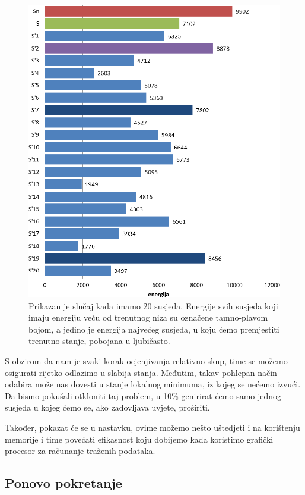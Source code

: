 \documentclass[times, utf8, zavrsni]{fer}
\begin{document}
\begin{figure}
\centering
\includegraphics[scale=0.5]{res/energije_susjeda.png}
\caption[Korištenje više susjeda u algoritmu simuliranog kaljenja]{
Prikazan je slučaj kada imamo 20 susjeda. Energije svih susjeda koji
imaju energiju veću od trenutnog niza su označene tamno-plavom bojom,
a jedino je energija najvećeg susjeda, u koju ćemo premjestiti trenutno
stanje, pobojana u ljubičasto.}
\label{figure:susjedi}
\end{figure}

S obzirom da nam je svaki korak ocjenjivanja relativno skup, time se možemo
osigurati rijetko odlazimo u slabija stanja. Međutim, takav pohlepan
način odabira može nas dovesti u stanje lokalnog minimuma, iz kojeg se nećemo
izvući. Da bismo pokušali otkloniti taj problem, u 10\% genirirat ćemo samo jednog
susjeda u kojeg ćemo se, ako zadovljava uvjete, proširiti. 

Također, pokazat će se u nastavku, ovime možemo nešto uštedjeti i na korištenju
memorije i time povećati efikasnost koju dobijemo kada koristimo grafički
procesor za računanje traženih podataka. 

\subsection{Ponovo pokretanje}
\end{document}
